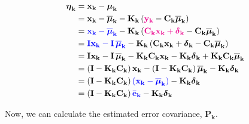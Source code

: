 \documentclass[12pt]{article}
\newcommand{\bvec}[1]{\boldsymbol{\mathbf{#1}}} %
\newcommand{\mat}[1]{\boldsymbol{\mathbf{#1}}}
\newcommand{\parentheses}[1]{\left(#1\right)}
\newcommand{\mb}[1]{{\boldsymbol{#1}}} %
\newcommand{\blue}[1]{\color{blue}#1\color{black}}
\newcommand{\magenta}[1]{\color{magenta}#1\color{black}}
\begin{document}
\begin{equation}
    \begin{aligned}
       \mb{\eta}_\mathbf{k} &= \bvec{x_k} - \mb{\mu}_\mathbf{k} \\
       &= \bvec{x_k} - \mb{\overline{\mu}}_\mathbf{k} - \mat{K_k}\parentheses{\magenta{\bvec{y_k}} - \mat{C_k}\mb{\overline{\mu}}_\mathbf{k}}\\
       &= \blue{\bvec{x_k} - \mb{\overline{\mu}}_\mathbf{k}} - \mat{K_k}\parentheses{\magenta{\mat{C_k}\bvec{x_k} + \mb{\delta}_\mathbf{k}} - \mat{C_k}\mb{\overline{\mu}}_\mathbf{k}}\\
       &= \blue{\mat{I}\bvec{x_k} - \mat{I}\,\mb{\overline{\mu}}_\mathbf{k}} - \mat{K_k}\parentheses{\mat{C_k}\bvec{x_k} + \mb{\delta}_\mathbf{k} - \mat{C_k}\mb{\overline{\mu}}_\mathbf{k}}\\
       &= \mat{I}\bvec{x_k} - \mat{I}\,\mb{\overline{\mu}}_\mathbf{k} - \mat{K_k}\mat{C_k}\bvec{x_k} - \mat{K_k}\mb{\delta}_\mathbf{k} + \mat{K_k}\mat{C_k}\mb{\overline{\mu}}_\mathbf{k}\\
       &= \parentheses{\mat{I} - \mat{K_k}\mat{C_k}}\bvec{x_k} - \parentheses{\mat{I} - \mat{K_k}\mat{C_k}}\mb{\overline{\mu}}_\mathbf{k} - \mat{K_k}\mb{\delta}_\mathbf{k}\\
       &= \parentheses{\mat{I} - \mat{K_k}\mat{C_k}} \blue{\parentheses{\bvec{x_k} - \mb{\overline{\mu}}_\mathbf{k}}} - \mat{K_k}\mb{\delta}_\mathbf{k}\\
       &= \parentheses{\mat{I} - \mat{K_k}\mat{C_k}} \blue{\bvec{\bar{e}_k}} - \mat{K_k}\mb{\delta}_\mathbf{k}\\
    \end{aligned}
    \label{eq:estimated-error}
\end{equation}

Now, we can calculate the estimated error covariance, $\mat{P_k}$.
\end{document}
